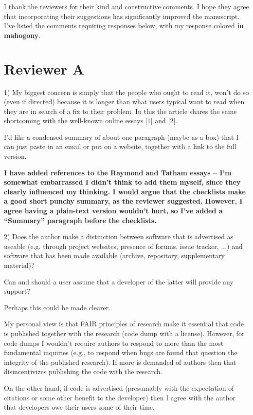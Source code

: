 \documentclass[11pt]{article}
\newcommand{\response}[1]{\textcolor{Mahogany}{\textbf{#1}}}
\begin{document}
I thank the reviewers for their kind and constructive comments. I hope they agree that incorporating their suggestions has significantly improved the manuscript. I've listed the comments requiring responses below, with my response colored \response{in mahogony}.

\section{Reviewer A}

1) My biggest concern is simply that the people who ought to read it,
won't do so (even if directed) because it is longer than what users
typical want to read when they are in search of a fix to their
problem. In this the article shares the same shortcoming with the
well-known online essays [1] and [2].

I'd like a condensed summary of about one paragraph (maybe as a
box) that I can just paste in an email or put on a website,
together with a link to the full version.

\response{I have added references to the Raymond and Tatham essays -- I'm
somewhat embarrassed I didn't think to add them myself, since they clearly
influenced my thinking. I would argue that the checklists make
a good short punchy summary, as the reviewer suggested. However, I agree having
a plain-text version wouldn't hurt, so I've added a ``Summary'' paragraph before
the checklists.}

2) Does the author make a distinction between software that is
advertised as useable (e.g. through project websites, presence of
forums, issue tracker, ...) and software that has been made
available (archive, repository, supplementary material)?

Can and should a user assume that a developer of the latter will
provide any support?

Perhaps this could be made clearer.

My personal view is that FAIR principles of research make it
essential that code is published together with the research (code
dump with a license). However, for code dumps I wouldn't require
authors to respond to more than the most fundamental inquiries
(e.g., to respond when bugs are found that question the integrity
of the published research). If more is demanded of authors then
that disincentivizes publishing the code with the research.

On the other hand, if code is advertised (presumably with the
expectation of citations or some other benefit to the developer)
then I agree with the author that developers owe their users some
of their time.
\end{document}
